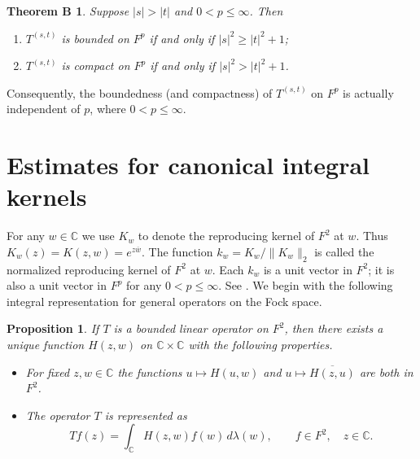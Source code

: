 \documentclass[reqno]{amsart}
\newtheorem{proposition}[theorem]{Proposition}
\newtheorem*{thmb}{Theorem B}
\newcommand{\C}{{\mathbb C}}
\newcommand{\inc}{\int_{\C}}
\begin{document}
\begin{thmb}
Suppose $|s|>|t|$ and $0<p\leq\infty$. Then
\begin{enumerate}
\item[(a)] $T^{(s, t)}$ is bounded on $F^p$ if and only if $|s|^2\ge|t|^2+1$;
\item[(b)] $T^{(s,t)}$ is compact on $F^p$ if and only if $|s|^2>|t|^2+1$.
\end{enumerate}
\end{thmb}

Consequently, the boundedness (and compactness) of $T^{(s,t)}$ on $F^p$
is actually independent of $p$, where $0<p\le\infty$.




\section{Estimates for canonical integral kernels}

For any $w\in\C$ we use $K_w$ to denote the reproducing kernel of $F^2$ 
at $w$. Thus $K_w(z)=K(z,w)=e^{z\overline w}$. The function $k_w=
K_w/\|K_w\|_2$ is called the normalized reproducing kernel of
$F^2$ at $w$. Each $k_w$ is a unit vector in $F^2$; it is also a unit
vector in $F^p$ for any $0<p\le\infty$. See \cite{Zhu1}. We begin with the 
following integral representation for general operators on the Fock space.

\begin{proposition}\label{1}
If $T$ is a bounded linear operator on $F^2$, then there exists a unique
function $H(z,w)$ on $\C\times\C$ with the following properties.
\begin{itemize}
\item[(i)] For fixed $z,w\in\C$ the functions $u\mapsto H(u,w)$
and $u\mapsto\overline{H(z,u)}$ are both in $F^2$.
\item[(ii)] The operator $T$ is represented as
\begin{equation}\label{integral_rep_for_T}
Tf(z)=\inc H(z,w)f(w)\,d\lambda(w),\qquad f\in F^2,\quad z\in\C.
\end{equation}
\end{itemize}
\end{proposition}
\end{document}
